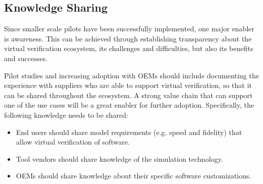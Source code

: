 
\subsection{Knowledge Sharing}
Since smaller scale pilots have been successfully implemented, one major enabler is awareness.
This can be achieved through establishing transparency about the virtual verification ecosystem, its challenges and difficulties, but also its benefits and successes. 

Pilot studies and increasing adoption with OEMs should include documenting the experience with suppliers who are able to support virtual verification,
so that it can be shared throughout the ecosystem.
A strong value chain that can support one of the use cases will be a great enabler for further adoption.
Specifically, the following knowledge needs to be shared:
\begin{itemize}
  \item End users should share model requirements (e.g. speed and fidelity) that allow virtual verification of software.
  \item Tool vendors should share knowledge of the simulation technology.
  \item OEMs should share knowledge about their specific software customizations.
\end{itemize}


